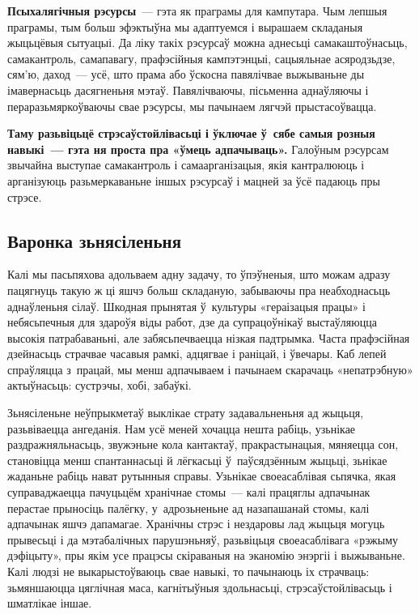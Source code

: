 \textbf{Псыхалягічныя рэсурсы}~--- гэта як праграмы для кампутара. Чым лепшыя праграмы, тым больш эфэктыўна мы адаптуемся і вырашаем складаныя жыцьцёвыя сытуацыі. Да ліку такіх рэсурсаў можна аднесьці самакаштоўнасьць, самакантроль, самапавагу, прафэсійныя кампэтэнцыі, сацыяльнае асяродзьдзе, сям'ю, даход~--- усё, што прама або ўскосна павялічвае выжываньне ды імавернасьць дасягненьня мэтаў. Павялічваючы, пісьменна аднаўляючы і пераразьмяркоўваючы свае рэсурсы, мы пачынаем лягчэй прыстасоўвацца. 

\textbf{Таму разьвіцьцё стрэсаўстойлівасьці і ўключае ў~сябе самыя розныя навыкі~--- гэта ня проста пра «ўмець адпачываць».} Галоўным рэсурсам звычайна выступае самакантроль і самаарганізацыя, якія кантралююць і арганізуюць разьмеркаваньне іншых рэсурсаў і мацней за ўсё падаюць пры стрэсе.

\subsection*{Варонка зьнясіленьня} Калі мы пасьпяхова адольваем адну задачу, то ўпэўненыя, што можам адразу пацягнуць такую ж ці яшчэ больш складаную, забываючы пра неабходнасьць аднаўленьня сілаў. Шкодная прынятая ў~культуры «гераізацыя працы» і небясьпечныя для здароўя віды работ, дзе да супрацоўнікаў выстаўляюцца высокія патрабаваньні, але забясьпечваецца нізкая падтрымка. Часта прафэсійная дзейнасьць страчвае часавыя рамкі, адцягвае і раніцай, і ўвечары. Каб лепей спраўляцца з~працай, мы менш адпачываем і пачынаем скарачаць «непатрэбную» актыўнасьць: сустрэчы, хобі, забаўкі. 


Зьнясіленьне неўпрыкметаў выклікае страту задавальненьня ад жыцьця, разьвіваецца ангеданія. Нам усё меней хочацца нешта рабіць, узьнікае раздражняльнасьць, звужэньне кола кантактаў, пракрастынацыя, мяняецца сон, становіцца менш спантаннасьці й лёгкасьці ў~паўсядзённым жыцьці, зьнікае жаданьне рабіць нават рутынныя справы. Узьнікае своеасаблівая сьпячка, якая суправаджаецца пачуцьцём хранічнае стомы~--- калі працяглы адпачынак перастае прыносіць палёгку, у~адрозьненьне ад назапашанай стомы, калі адпачынак яшчэ дапамагае. Хранічны стрэс і нездаровы лад жыцьця могуць прывесьці і да мэтабалічных парушэньняў, разьвіцьця своеасаблівага «рэжыму дэфіцыту», пры якім усе працэсы скіраваныя на эканомію энэргіі і выжываньне. Калі людзі не выкарыстоўваюць свае навыкі, то пачынаюць іх страчваць: зьмяншаюцца цяглічная маса, кагнітыўныя здольнасьці, стрэсаўстойлівасьць і шматлікае іншае.

